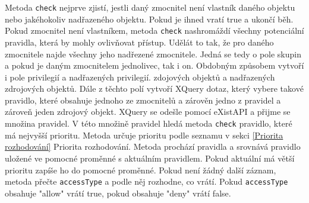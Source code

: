 Metoda \verb|check| nejprve zjistí, jestli daný zmocnitel není vlastník daného objektu nebo jakéhokoliv nadřazeného objektu. Pokud je ihned vratí true a ukončí běh. 
Pokud zmocnitel není vlastníkem, metoda \verb|check| nashromáždí všechny potenciální pravidla, která by mohly ovlivňovat přístup. Udělát to tak, že pro daného zmocnitele najde všechny jeho nadřezené zmocnitele. Jedná se tedy o pole skupin a pokud je daným zmocnitelem jednolivec, tak i on. Obdobným způsobem vytvoří i pole privilegií a nadřazených privilegií. zdojových objektů a nadřazených zdrojových objektů. Dále z těchto polí vytvoří XQuery dotaz, který vybere takové pravidlo, které obsahuje jednoho ze zmocnitelů a zárověn jedno z pravidel a zároveň jeden zdrojový objekt. XQuery se odešle pomocí eXistAPI a přijme se množina pravidel. V této množině pravidel hledá metoda \verb|check| pravidlo, které má nejvyšší prioritu. Metoda určuje prioritu podle seznamu v sekci \ref{Priorita rozhodování} Priorita rozhodování. Metoda prochází pravidla a srovnává pravidlo uložené ve pomocné proměnné s aktuálním pravidlem. Pokud aktuální má větší prioritu zapíše ho do pomocné proměnné. Pokud není žádný další záznam, metoda přečte \verb|accessType| a podle něj rozhodne, co vrátí. Pokud \verb|accessType| obsahuje "allow" vrátí true, pokud obsahuje "deny" vrátí false.
